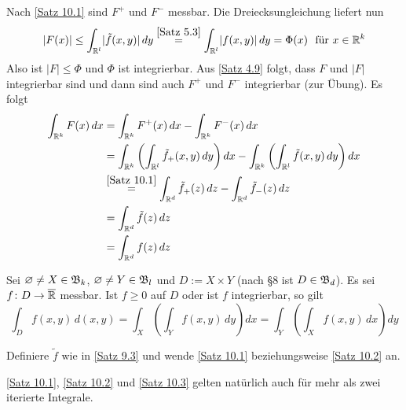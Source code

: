 \documentclass[a4paper,twoside,DIV15,BCOR12mm,chapterprefix=true,headings=onelinechapter]{scrbook}
\begin{document}
\begin{beweis}
Nach \ref{Satz 10.1} sind \(F^+\) und \(F^-\) messbar. Die Dreiecksungleichung liefert nun
	\begin{align*}
	\lvert F(x)\rvert 
	\leq \int_{\mathbb{R}^l}\lvert \tilde f(x,y)\rvert\,dy 
	\overset{\ref{Satz 5.3}}= \int_{\mathbb{R}^l}\lvert f(x,y)\rvert\,dy 
	= \Phi(x) \ \text{ für } x\in\mathbb{R}^k
	\end{align*}
Also ist \(\lvert F\rvert\leq\Phi\) und \(\Phi\) ist integrierbar. Aus \ref{Satz 4.9} folgt, dass $F$ und \(\lvert F\rvert\) integrierbar sind 
und dann sind auch \(F^+\) und \(F^-\) integrierbar (zur Übung). Es folgt
	\begin{align*}
	\int_{\mathbb{R}^k}F(x)\,dx
	& = \int_{\mathbb{R}^k}F^+(x)\,dx - \int_{\mathbb{R}^k}F^-(x)\,dx 											\\
	& = \int_{\mathbb{R}^k} \left(\int_{\mathbb{R}^l} \tilde f_+(x,y)\,dy\right)dx - \int_{\mathbb{R}^k} \left(\int_{\mathbb{R}^l}\tilde f(x,y)\,dy\right)dx 		\\
	& \overset{\ref{Satz 10.1}}= \int_{\mathbb{R}^d}\tilde f_+(z)\,dz - \int_{\mathbb{R}^d}\tilde f_-(z)\,dz 						\\
	& = \int_{\mathbb{R}^d}\tilde f(z)\,dz 														\\
	& = \int_{\mathbb{R}^d}f(z)\,dz
	\end{align*}
\end{beweis}

\begin{satz}
\label{Satz 10.3}
Sei \(\varnothing\neq X\in\mathfrak{B}_k\), \(\varnothing\neq Y\in\mathfrak{B}_l\) und \(D:=X\times Y\) (nach \S 8 ist \(D\in\mathfrak{B}_d\)).
Es sei \(f\colon D\to\overline{\mathbb{R}}\) messbar.
Ist \(f\geq 0\) auf $D$ oder ist $f$ integrierbar, so gilt
\[ \int_D f(x,y)\,d(x,y) = \int_X\left(\int_Yf(x,y)\,dy\right)dx = \int_Y\left(\int_Xf(x,y)\,dx\right)dy \]
\end{satz}

\begin{beweis}
Definiere \(\tilde f\) wie in \ref{Satz 9.3} und wende \ref{Satz 10.1} beziehungsweise \ref{Satz 10.2} an.
\end{beweis}

\begin{bemerkung}
\ref{Satz 10.1}, \ref{Satz 10.2} und \ref{Satz 10.3} gelten natürlich auch für mehr als zwei iterierte Integrale.
\end{bemerkung}
\end{document}
